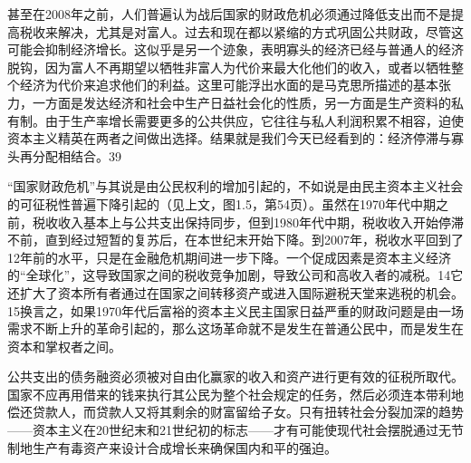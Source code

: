 甚至在2008年之前，人们普遍认为战后国家的财政危机必须通过降低支出而不是提高税收来解决，尤其是对富人。过去和现在都以紧缩的方式巩固公共财政，尽管这可能会抑制经济增长。这似乎是另一个迹象，表明寡头的经济已经与普通人的经济脱钩，因为富人不再期望以牺牲非富人为代价来最大化他们的收入，或者以牺牲整个经济为代价来追求他们的利益。这里可能浮出水面的是马克思所描述的基本张力，一方面是发达经济和社会中生产日益社会化的性质，另一方面是生产资料的私有制。由于生产率增长需要更多的公共供应，它往往与私人利润积累不相容，迫使资本主义精英在两者之间做出选择。结果就是我们今天已经看到的：经济停滞与寡头再分配相结合。39

“国家财政危机”与其说是由公民权利的增加引起的，不如说是由民主资本主义社会的可征税性普遍下降引起的（见上文，图1.5，第54页）。虽然在1970年代中期之前，税收收入基本上与公共支出保持同步，但到1980年代中期，税收收入开始停滞不前，直到经过短暂的复苏后，在本世纪末开始下降。到2007年，税收水平回到了12年前的水平，只是在金融危机期间进一步下降。一个促成因素是资本主义经济的“全球化”，这导致国家之间的税收竞争加剧，导致公司和高收入者的减税。14它还扩大了资本所有者通过在国家之间转移资产或进入国际避税天堂来逃税的机会。15换言之，如果1970年代后富裕的资本主义民主国家日益严重的财政问题是由一场需求不断上升的革命引起的，那么这场革命就不是发生在普通公民中，而是发生在资本和掌权者之间。

公共支出的债务融资必须被对自由化赢家的收入和资产进行更有效的征税所取代。国家不应再用借来的钱来执行其公民为整个社会规定的任务，然后必须连本带利地偿还贷款人，而贷款人又将其剩余的财富留给子女。只有扭转社会分裂加深的趋势——资本主义在20世纪末和21世纪初的标志——才有可能使现代社会摆脱通过无节制地生产有毒资产来设计合成增长来确保国内和平的强迫。
